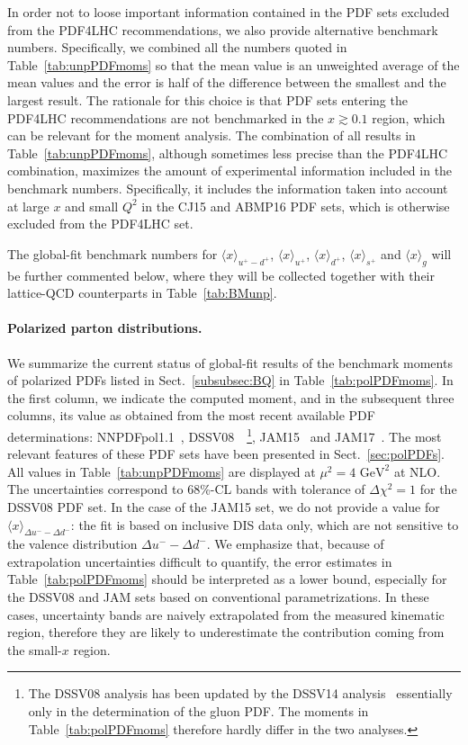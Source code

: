 In order not to loose important information contained in the PDF sets excluded 
from the PDF4LHC recommendations, we also provide alternative benchmark numbers.
%
Specifically, we combined all the numbers quoted in Table~\ref{tab:unpPDFmoms}
so that the mean value is an unweighted average of the mean 
values and the error is half of the difference between the smallest and the 
largest result.
%
The rationale for this choice is that PDF sets entering the PDF4LHC 
recommendations are not benchmarked in the $x\gtrsim 0.1$ region, which can be 
relevant for the moment analysis.
%
The combination of all results in Table~\ref{tab:unpPDFmoms}, although 
sometimes less precise than the PDF4LHC combination, maximizes the amount of 
experimental information included in the benchmark numbers.
%
Specifically, it includes the information taken into account 
at large $x$ and small $Q^2$ in the CJ15 and ABMP16 PDF sets, 
which is otherwise excluded from the PDF4LHC set.

The global-fit benchmark numbers for $\langle x\rangle_{u^+-d^+}$,
$\langle x \rangle_{u^+}$, $\langle x \rangle_{d^+}$, 
$\langle x \rangle_{s^+}$ and $\langle x \rangle_g$ will be further
commented below, where they will be collected together with their 
lattice-QCD counterparts in Table~\ref{tab:BMunp}.

\paragraph{Polarized parton distributions.}
%
We summarize the current status of global-fit results of the benchmark
moments of polarized PDFs listed in Sect.~\ref{subsubsec:BQ} in 
Table~\ref{tab:polPDFmoms}.
%
In the first column, we indicate the computed moment, and in the subsequent 
three columns, its value as obtained from the most recent available PDF 
determinations: NNPDFpol1.1~\cite{Nocera:2014gqa}, 
DSSV08~\cite{deFlorian:2009vb}~\footnote{The DSSV08 analysis has been updated
by the DSSV14 analysis~\cite{deFlorian:2014yva} essentially 
only in the determination of the gluon PDF. 
The moments in Table~\ref{tab:polPDFmoms} therefore hardly differ
in the two analyses.}, JAM15~\cite{Sato:2016tuz} and 
JAM17~\cite{Ethier:2017zbq}.
%
The most relevant features of these PDF sets have been presented in
Sect.~\ref{sec:polPDFs}.
%
All values in Table~\ref{tab:unpPDFmoms} are displayed
at $\mu^2=4\mbox{ GeV}^2$ at NLO.
%
The uncertainties correspond to 68\%-CL bands with tolerance of 
$\Delta \chi^2=1$ for the DSSV08 PDF set.
%
In the case of the JAM15 set, we do not provide a value for 
$\langle x \rangle _{\Delta u^--\Delta d^-}$:
the fit is based on inclusive DIS data only, which are not sensitive to 
the valence distribution $\Delta u^- - \Delta d^-$.
%
We emphasize that, because of extrapolation uncertainties difficult to quantify,
the error estimates in Table~\ref{tab:polPDFmoms} should be interpreted
as a lower bound, especially for the DSSV08 and JAM sets based on 
conventional parametrizations.
%
In these cases, uncertainty bands are naively extrapolated from the measured 
kinematic region, therefore they are likely to underestimate the contribution 
coming from the small-$x$ region.

